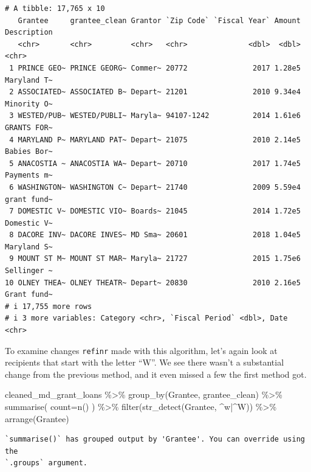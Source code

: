 \documentclass[
  letterpaper,
  DIV=11,
  numbers=noendperiod]{scrreprt}
\newenvironment{Shaded}{\begin{snugshade}}{\end{snugshade}}
\newcommand{\AttributeTok}[1]{\textcolor[rgb]{0.40,0.45,0.13}{#1}}
\newcommand{\FunctionTok}[1]{\textcolor[rgb]{0.28,0.35,0.67}{#1}}
\newcommand{\NormalTok}[1]{\textcolor[rgb]{0.00,0.23,0.31}{#1}}
\newcommand{\SpecialCharTok}[1]{\textcolor[rgb]{0.37,0.37,0.37}{#1}}
\newcommand{\StringTok}[1]{\textcolor[rgb]{0.13,0.47,0.30}{#1}}
\begin{document}
\begin{verbatim}
# A tibble: 17,765 x 10
   Grantee     grantee_clean Grantor `Zip Code` `Fiscal Year` Amount Description
   <chr>       <chr>         <chr>   <chr>              <dbl>  <dbl> <chr>      
 1 PRINCE GEO~ PRINCE GEORG~ Commer~ 20772               2017 1.28e5 Maryland T~
 2 ASSOCIATED~ ASSOCIATED B~ Depart~ 21201               2010 9.34e4 Minority O~
 3 WESTED/PUB~ WESTED/PUBLI~ Maryla~ 94107-1242          2014 1.61e6 GRANTS FOR~
 4 MARYLAND P~ MARYLAND PAT~ Depart~ 21075               2010 2.14e5 Babies Bor~
 5 ANACOSTIA ~ ANACOSTIA WA~ Depart~ 20710               2017 1.74e5 Payments m~
 6 WASHINGTON~ WASHINGTON C~ Depart~ 21740               2009 5.59e4 grant fund~
 7 DOMESTIC V~ DOMESTIC VIO~ Boards~ 21045               2014 1.72e5 Domestic V~
 8 DACORE INV~ DACORE INVES~ MD Sma~ 20601               2018 1.04e5 Maryland S~
 9 MOUNT ST M~ MOUNT ST MAR~ Maryla~ 21727               2015 1.75e6 Sellinger ~
10 OLNEY THEA~ OLNEY THEATR~ Depart~ 20830               2010 2.16e5 Grant fund~
# i 17,755 more rows
# i 3 more variables: Category <chr>, `Fiscal Period` <dbl>, Date <chr>
\end{verbatim}

To examine changes \texttt{refinr} made with this algorithm, let's again
look at recipients that start with the letter ``W''. We see there wasn't
a substantial change from the previous method, and it even missed a few
the first method got.

\begin{Shaded}
\begin{Highlighting}[]
\NormalTok{cleaned\_md\_grant\_loans }\SpecialCharTok{\%\textgreater{}\%}
  \FunctionTok{group\_by}\NormalTok{(Grantee, grantee\_clean) }\SpecialCharTok{\%\textgreater{}\%}
  \FunctionTok{summarise}\NormalTok{(}
    \AttributeTok{count=}\FunctionTok{n}\NormalTok{()}
\NormalTok{  ) }\SpecialCharTok{\%\textgreater{}\%}
  \FunctionTok{filter}\NormalTok{(}\FunctionTok{str\_detect}\NormalTok{(Grantee, }\StringTok{\textquotesingle{}\^{}w|\^{}W\textquotesingle{}}\NormalTok{)) }\SpecialCharTok{\%\textgreater{}\%}
  \FunctionTok{arrange}\NormalTok{(Grantee)}
\end{Highlighting}
\end{Shaded}

\begin{verbatim}
`summarise()` has grouped output by 'Grantee'. You can override using the
`.groups` argument.
\end{verbatim}
\end{document}
